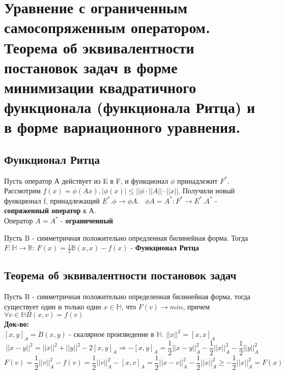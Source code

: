 \documentclass[__main__.tex]{subfiles}
\begin{document}
\section{Уравнение с ограниченным самосопряженным оператором. Теорема об эквивалентности постановок задач в форме минимизации квадратичного функционала (функционала Ритца) и в форме вариационного уравнения.}

\subsection{Функционал Ритца}
\begin{definition}
	Пусть  оператор А действует из E в F, и функционал $\phi$ принадлежит $F^{*}$. Рассмотрим $f(x)=\phi(Ax), |\phi(x)|\leq||\phi \cdot ||A|| \cdot ||x||.$ Получили новый функционал f, принадлежащий  $E^{*}. \phi \rightarrow \phi A. $ \
	$\phi A = A^{*}:F^{*}\rightarrow E^{*}. A^{*}$ - \textbf{сопряженный оператор} к А. \\
	 Оператор $A=A^{*}$ - \textbf{ограниченный}
\end{definition}
\begin{definition}
Пусть B - симметричная положительно опредленная билинейная форма. Тогда $F:\mathbb{H}\rightarrow \mathbb{R}$:
$F(x)=\frac{1}{2}\mathbb{B}(x,x)-f(x)$ - \textbf{Функционал Ритца}
\end{definition}
\subsection{Теорема об эквивалентности постановок задач}
\begin{theorem}
	Пусть B - симметричная положительно определенная билинейная форма, тогда существует один и только один $x\in \mathbb{H}$, что $F(v)\rightarrow min$, причем $\forall v\in \mathbb{H}    B(x,v)=f(v)$
	\\
	\textbf{Док-во:}
	\\
	$[x,y]_{A}=B(x,y)$ - скалярное произведение в $\mathbb{H}$.  $||x||^{2}=[x,x]_{A}$
	$$||x-y||^{2}=||x||^{2}+||y||^{2}-2[x,y]_{A} \Rightarrow -[x,y]_{A}=\frac{1}{2}||x-y||^{2}_{A}-\frac{1}{2}||x||^{2}_{A}-\frac{1}{2}||y||^{2}_{A}
	$$
	$$F(v)=\frac{1}{2}||v||^{2}_{A}-f(v)=\frac{1}{2}||v||^{2}_{A}-[x,v]_{A}=\frac{1}{2}||x-v||^{2}_{A}-\frac{1}{2}||x||^{2}_{A} \geq -\frac{1}{2}||x||^{2}_{A}=F(x)$$
	
\end{theorem}
\end{document}
